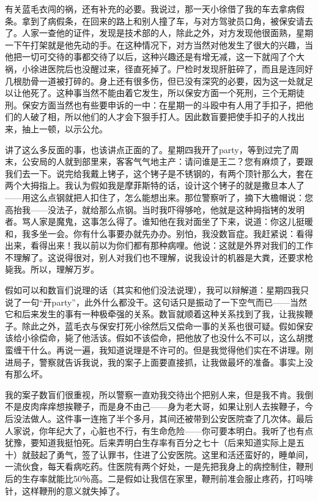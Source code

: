 有关蓝毛衣闯的祸，还有补充的必要。我说过，那一天小徐借了我的车去拿病假条。拿到了病假条，在回来的路上和别人撞了车，与对方驾驶员口角，被保安请去了。人家一查他的证件，发现是技术部的人，除此之外，对方发现他很面熟，星期一下午打架就是他先动的手。在这种情况下，对方当然对他发生了很大的兴趣，当他把一切可交待的事都交待了以后，这种兴趣还是有增无减，这一下就闯了个大祸，小徐进医院后也没醒过来，径直死掉了。尸检时发现肝脏碎了，而且是连同好几根肋骨一道被打碎的。身上还有很多伤，但已没有深究的必要，因为这一处就足以让他死了。这种事当然不能由着它发生，所以保安方面一个死刑，三个无期徒刑。保安方面当然也有些要申诉的一中：在星期一的斗殴中有人用了手扣子，把他们的人破了相，所以他们的人才会下狠手打人。因此数盲要把使手扣子的人找出来，抽上一顿，以示公允。 

讲了这么多反面的事，也该讲点正面的了。星期四我开了party，等到过完了周末，公安局的人就到部里来，客客气气地主产：请问谁是王二？您有麻烦了，要跟我们去一下。说完给我戴上铐子，这个铐子是不锈钢的，有两个顶针那么大，套在两个大拇指上。我认为假如我是摩菲斯特的话，设计这个铐子的就是撒旦本人了——用这么点钢就把人扣住了，怎么能想出来。那位警察听了，摘下大檐帽说：您高抬我——没法子，就给那么点钢。当时我吓得够呛，他就是这种拇指铐的发明者。骂人家是魔鬼，这事怎么得了。谁知他在我对面坐了下来，说道：你这儿挺暖和，我多坐一会。你有什么事要办就先办办。别怕，我没数盲症。我赶紧说：看得出来，看得出来！我以前以为你们都有那种病哩。他说：这就是外界对我们的工作不理解了。这说得很对，别人对我们也不理解，说我设计的机器是大粪，还要求枪毙我。所以，理解万岁。 



假如可以和数盲们说理的话（其实和他们没法说理），我可以辩解道：星期四我只说了一句“开party”，此外什么都没干。这句话只是振动了一下空气而已——当然它和后来发生的事有一种极牵强的关系。数盲就顺着这种关系找到了我，让我挨鞭子。除此之外，蓝毛衣与保安打死小徐然后又偿命一事的关系也很可疑。假如保安该给小徐偿命，毙了他活该。假如不该偿命，把他放了也没什么不可以，这么胡搅蛮缠干什么。再说一遍，我知道说理是不许可的。但是我觉得他们实在不讲理。刚进局子，警察就告诉我说，我的案子上面要直接抓，让我做最坏的准备。事实上没有那么坏。 

我的案子数盲们很重视，所以警察一直劝我交待出个把别人来，但是我不肯。我倒不是皮肉痒痒想挨鞭子，而是身不由己——身为老大哥，如果让别人去挨鞭子，今后没法做人。这件事一连拖了半个多月，其间还被带到公安医院查了几次体。最后人家说，你年纪大了，心脏也不行，有生命危险——你可要本明白。我听了也有点犹豫，要知道我挺怕死。后来弄明白生存率有百分之七十（后来知道实际上是五十）就鼓起了勇气，签了认罪书，住进了公安医院。这里和活还蛮好的，睡单间，一流伙食，每天看病吃药。住医院有两个好处，一是先把我身上的病控制住，鞭刑后的生存率就能比50％高。二是假如让我信在家里，鞭刑前准会服止疼药，打吗啡针，这样鞭刑的意义就失掉了。 

